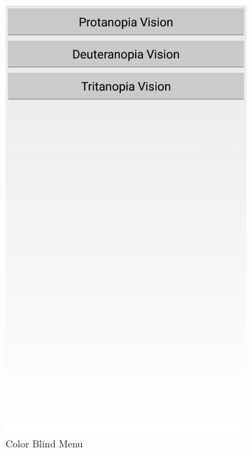 \documentclass[12pt]{article}
\begin{document}
\begin{figure}[h]
\begin{subfigure}{.25\textwidth}
	\includegraphics[width=.9\linewidth]{ApplicationScreenshots/ColorBlind.jpg}
	\caption*{Color Blind Menu}
\end{subfigure}%
\begin{subfigure}{.25\textwidth}
	\centering

\end{subfigure}
\end{figure}
\end{document}
